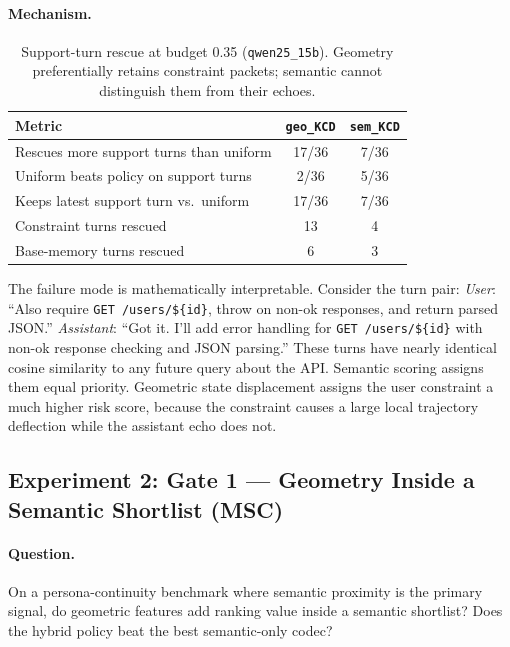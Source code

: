 \documentclass[conference]{IEEEtran}
\begin{document}
\paragraph{Mechanism.}

\begin{table}[t]
  \centering
  \caption{Support-turn rescue at budget 0.35 (\texttt{qwen25\_15b}).
  Geometry preferentially retains constraint packets; semantic cannot
  distinguish them from their echoes.}
  \label{tab:rescue}
  \begin{tabular}{lcc}
    \toprule
    Metric & \texttt{geo\_KCD} & \texttt{sem\_KCD} \\
    \midrule
    Rescues more support turns than uniform & 17/36 & 7/36 \\
    Uniform beats policy on support turns & 2/36 & 5/36 \\
    Keeps latest support turn vs.\ uniform & 17/36 & 7/36 \\
    Constraint turns rescued & 13 & 4 \\
    Base-memory turns rescued & 6 & 3 \\
    \bottomrule
  \end{tabular}
\end{table}

The failure mode is mathematically interpretable. Consider the turn pair:
\emph{User}: ``Also require \texttt{GET /users/\$\{id\}}, throw on non-ok
responses, and return parsed JSON.'' \emph{Assistant}: ``Got it. I'll add error
handling for \texttt{GET /users/\$\{id\}} with non-ok response checking and
JSON parsing.'' These turns have nearly identical cosine similarity to any
future query about the API. Semantic scoring assigns them equal priority.
Geometric state displacement assigns the user constraint a much higher risk
score, because the constraint causes a large local trajectory deflection while
the assistant echo does not.

\subsection{Experiment 2: Gate 1 --- Geometry Inside a Semantic Shortlist (MSC)}
\label{sec:gate1}

\paragraph{Question.} On a persona-continuity benchmark where semantic proximity
is the primary signal, do geometric features add ranking value inside a semantic
shortlist? Does the hybrid policy beat the best semantic-only codec?
\end{document}
